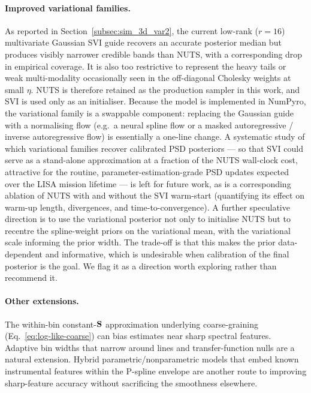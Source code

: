 \documentclass[%
	reprint,
	nofootinbib,
	amsmath,
	amssymb,
	aps,
]{revtex4-2}
\begin{document}
	\paragraph{Improved variational families.}
	As reported in Section~\ref{subsec:sim_3d_var2}, the current low-rank
	($r=16$) multivariate Gaussian SVI guide recovers an accurate
	posterior median but produces visibly narrower credible bands than
	NUTS, with a corresponding drop in empirical coverage. It is also
	too restrictive to represent the heavy tails or weak multi-modality
	occasionally seen in the off-diagonal Cholesky weights at small
	$\eta$. NUTS is therefore retained as the production sampler in this
	work, and SVI is used only as an initialiser. Because the model is
	implemented in NumPyro, the variational family is a swappable
	component: replacing the Gaussian guide with a normalising flow
	(e.g.\ a neural spline flow or a masked autoregressive / inverse
	autoregressive flow) is essentially a one-line change. A systematic
	study of which variational families recover calibrated PSD
	posteriors --- so that SVI could serve as a stand-alone approximation
	at a fraction of the NUTS wall-clock cost, attractive for the
	routine, parameter-estimation-grade PSD updates expected over the
	LISA mission lifetime --- is left for future work, as is a
	corresponding ablation of NUTS with and without the SVI warm-start
	(quantifying its effect on warm-up length, divergences, and
	time-to-convergence). A further speculative direction is to use the
	variational posterior not only to initialise NUTS but to recentre
	the spline-weight priors on the variational mean, with the
	variational scale informing the prior width. The trade-off is that
	this makes the prior data-dependent and informative, which is
	undesirable when calibration of the final posterior is the goal. We
	flag it as a direction worth exploring rather than recommend it.

	\paragraph{Other extensions.}
	The within-bin constant-$\S$ approximation underlying coarse-graining
	(Eq.~\ref{eq:log-like-coarse}) can bias estimates near sharp
	spectral features. Adaptive bin widths that narrow around lines and
	transfer-function nulls are a natural extension. Hybrid
	parametric/nonparametric models that embed known instrumental
	features within the P-spline envelope are another route to improving
	sharp-feature accuracy without sacrificing the smoothness elsewhere.
\end{document}
